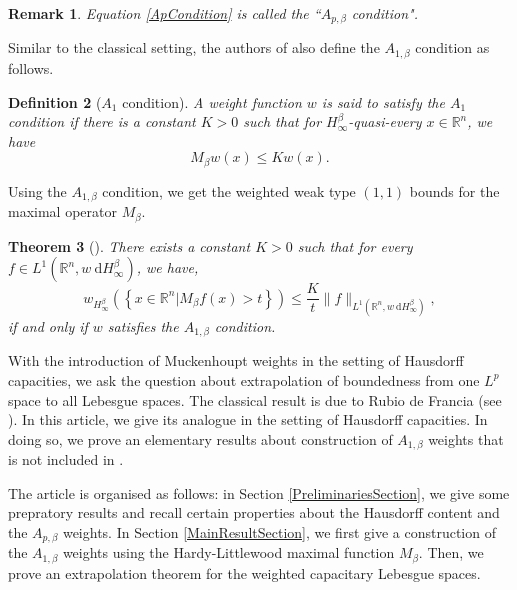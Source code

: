 \documentclass{amsart}
\newtheorem{theorem}{Theorem}
\newtheorem{definition}[theorem]{Definition}
\newtheorem{remark}[theorem]{Remark}
\numberwithin{theorem}{section}
\numberwithin{equation}{section}
\begin{document}
		\begin{remark}
			\normalfont
			Equation \eqref{ApCondition} is called the ``\textit{$A_{p, \beta}$ condition}".
		\end{remark}
		Similar to the classical setting, the authors of \cite{Huang} also define the $A_{1, \beta}$ condition as follows.
		\begin{definition}[$A_1$ condition]
			\label{A1ConditionDefinition}
			A weight function $w$ is said to satisfy the $A_1$ condition if there is a constant $K > 0$ such that for $H^{\beta}_{\infty}$-quasi-every $x \in \mathbb{R}^n$, we have
			\begin{equation}
				\label{A1Condition}
				M_{\beta}w \left( x \right) \leq K w \left( x \right).
			\end{equation}
		\end{definition}
		Using the $A_{1, \beta}$ condition, we get the weighted weak type $(1, 1)$ bounds for the maximal operator $M_{\beta}$.
		\begin{theorem}[\cite{Huang}]
			\label{WekTypeBoundedness}
			There exists a constant $K > 0$ such that for every $f \in L^1 \left( \mathbb{R}^n, w \ \mathrm{d}H^{\beta}_{\infty} \right)$, we have,
			\begin{equation}
				\label{Weak11}
				w_{H^{\beta}_{\infty}} \left( \left\lbrace x \in \mathbb{R}^n | M_{\beta}f \left( x \right) > t \right\rbrace \right) \leq \frac{K}{t} \| f \|_{L^1 \left( \mathbb{R}^n, w \ \mathrm{d}H^{\beta}_{\infty} \right)},
			\end{equation}
			if and only if $w$ satisfies the $A_{1, \beta}$ condition.
		\end{theorem}
		With the introduction of Muckenhoupt weights in the setting of Hausdorff capacities, we ask the question about extrapolation of boundedness from one $L^p$ space to all Lebesgue spaces. The classical result is due to Rubio de Francia (see \cite{RDF}). In this article, we give its analogue in the setting of Hausdorff capacities. In doing so, we prove an elementary results about construction of $A_{1, \beta}$ weights that is not included in \cite{Huang}.
		
		The article is organised as follows: in Section \ref{PreliminariesSection}, we give some prepratory results and recall certain properties about the Hausdorff content and the $A_{p, \beta}$ weights. In Section \ref{MainResultSection}, we first give a construction of the $A_{1, \beta}$ weights using the Hardy-Littlewood maximal function $M_{\beta}$. Then, we prove an extrapolation theorem for the weighted capacitary Lebesgue spaces.
\end{document}
